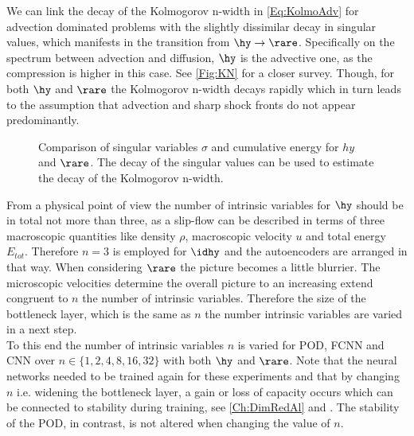 We can link the decay of the Kolmogorov n-width in \cref{Eq:KolmoAdv} for advection dominated problems with the slightly dissimilar decay in singular values, which manifests in the transition from \(\hy \rightarrow \rare \). Specifically on the spectrum between advection and diffusion, \(\hy\) is the advective one, as the compression is higher in this case. See \cref{Fig:KN} for a closer survey. Though, for both \(\hy\) and \(\rare\) the Kolmogorov n-width decays rapidly which in turn leads to the assumption that advection and sharp shock fronts do not appear predominantly.
\begin{figure}[!htbp]
	\begin{subfigure}{.45\textwidth}
		
		\label{Fig:CumSum_Rare}
	\end{subfigure}\hfill
	\begin{subfigure}{.45\textwidth}
		
		\label{Fig:CumSum_Hydro}
	\end{subfigure}
	\caption{Comparison of singular variables \(\sigma\) and cumulative energy for \(hy\) and \(\rare\). The decay of the singular values can be used to estimate the decay of the Kolmogorov n-width.}
	\label{Fig:CUSUM-e}
\end{figure}
From a physical point of view the number of intrinsic variables for \(\hy\) should be in total not more than three, as a slip-flow can be described in terms of three macroscopic quantities like density \(\rho\), macroscopic velocity \(u\) and total energy \(E_{tot}\)\cite{BGK}\cite{Bernard}. Therefore \(n=3\) is employed for \(\idhy\) and the autoencoders are arranged in that way. When considering \(\rare\) the picture becomes a little blurrier. The microscopic velocities determine the overall picture to an increasing extend congruent to \(n\) the number of intrinsic variables. Therefore the size of the bottleneck layer, which is the same as \(n\) the number intrinsic variables are varied in a next step.\\ To this end the number of intrinsic variables $n$ is varied for POD, FCNN and CNN over $n \in \{1,2,4,8,16,32\}$ with both $\hy$ and $\rare$. Note that the neural networks needed to be trained again for these experiments and that by changing $n$ i.e. widening the bottleneck layer, a gain or loss of capacity occurs which can be connected to stability during training, see \cref{Ch:DimRedAl} and \cite{Goodfellow}. The stability of the POD, in contrast, is not altered when changing the value of $n$.
